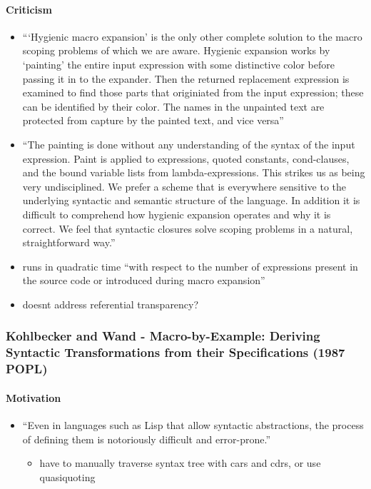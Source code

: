 \documentclass[12pt]{article}	%
\begin{document}
\paragraph{Criticism}

\begin{itemize}
	\item ```Hygienic macro expansion' is the only other complete solution to the macro scoping problems of which we are aware. Hygienic expansion works by `painting' the entire input expression with some distinctive color before passing it in to the expander. Then the returned replacement expression is examined to find those parts that originiated from the input expression; these can be identified by their color. The names in the unpainted text are protected from capture by the painted text, and vice versa''~\cite[p90]{Bawden1988Syntactic}
	\item ``The painting is done without any understanding of the syntax of the input expression. Paint is applied to expressions, quoted constants, cond-clauses, and the bound variable lists from lambda-expressions. This strikes us as being very undisciplined. We prefer a scheme that is everywhere sensitive to the underlying syntactic and semantic structure of the language. In addition it is difficult to comprehend how hygienic expansion operates and why it is correct. We feel that syntactic closures solve scoping problems in a natural, straightforward way.''~\cite[p90]{Bawden1988Syntactic}
	\item runs in quadratic time ``with respect to the number of expressions present in the source code or introduced during macro expansion''~\cite[p298]{Dybvig1992Syntactic}
	\item doesnt address referential transparency?~\cite[p299]{Dybvig1992Syntactic}
\end{itemize}





\subsubsection*{Kohlbecker and Wand - Macro-by-Example: Deriving Syntactic Transformations from their Specifications (1987 POPL)}

\paragraph{Motivation}
\begin{itemize}
	\item ``Even in languages such as Lisp that allow syntactic abstractions, the process of defining them is notoriously difficult and error-prone.''
	\begin{itemize}
		\item have to manually traverse syntax tree with cars and cdrs, or use quasiquoting
	\end{itemize}
\end{itemize}
\end{document}
